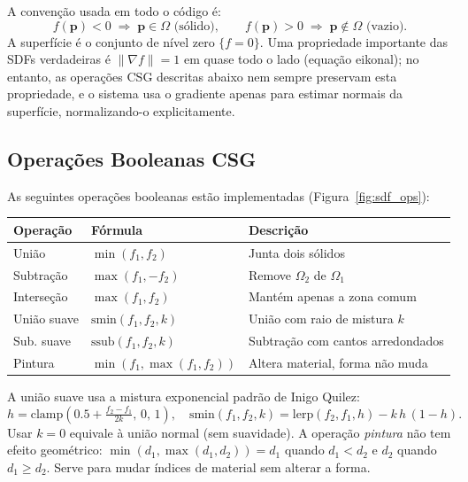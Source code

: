 \documentclass[10pt,a4paper]{article}
\begin{document}
\noindent A convenção usada em todo o código é:
\[
  f(\mathbf{p}) < 0 \;\Longrightarrow\; \mathbf{p}\in\Omega\text{ (sólido)},
  \qquad
  f(\mathbf{p}) > 0 \;\Longrightarrow\; \mathbf{p}\notin\Omega\text{ (vazio)}.
\]
A superfície é o conjunto de nível zero $\{f=0\}$. Uma propriedade
importante das SDFs verdadeiras é $\|\nabla f\| = 1$ em quase todo
o lado (equação eikonal); no entanto, as operações CSG descritas
abaixo nem sempre preservam esta propriedade, e o sistema usa o
gradiente apenas para estimar normais da superfície, normalizando-o
explicitamente.

\subsection{Operações Booleanas CSG}
\label{sec:sdf:ops}

As seguintes operações booleanas estão implementadas
(Figura~\ref{fig:sdf_ops}):

\begin{center}
\begin{tabular}{lll}
  \toprule
  Operação & Fórmula & Descrição\\
  \midrule
  União        & $\min(f_1, f_2)$              & Junta dois sólidos \\
  Subtração    & $\max(f_1, -f_2)$             & Remove $\Omega_2$ de $\Omega_1$\\
  Interseção   & $\max(f_1, f_2)$              & Mantém apenas a zona comum \\
  União suave  & $\text{smin}(f_1,f_2,k)$      & União com raio de mistura $k$\\
  Sub. suave   & $\text{ssub}(f_1,f_2,k)$      & Subtração com cantos arredondados\\
  Pintura      & $\min(f_1,\max(f_1,f_2))$     & Altera material, forma não muda\\
  \bottomrule
\end{tabular}
\end{center}

A união suave usa a mistura exponencial padrão de Inigo Quilez:
\[
  h = \text{clamp}\!\left(0.5 + \tfrac{f_2-f_1}{2k},\,0,\,1\right),
  \quad
  \text{smin}(f_1,f_2,k) = \text{lerp}(f_2,f_1,h) - k\,h\,(1-h).
\]
Usar $k=0$ equivale à união normal (sem suavidade). A operação
\emph{pintura} não tem efeito geométrico:
$\min(d_1,\max(d_1,d_2)) = d_1$ quando $d_1 < d_2$
e $d_2$ quando $d_1 \geq d_2$. Serve para mudar índices de material
sem alterar a forma.
\end{document}

